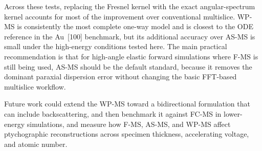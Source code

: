 \documentclass[preprint,12pt,number]{elsarticle}
\begin{document}
Across these tests, replacing the Fresnel kernel with the exact angular-spectrum
kernel accounts for most of the improvement over conventional multislice. WP-MS
is consistently the most complete one-way model and is closest to the ODE
reference in the Au~[100] benchmark, but its additional accuracy over AS-MS is
small under the high-energy conditions tested here. The main practical
recommendation is that for high-angle elastic forward simulations
where F-MS is still being used, AS-MS should be the default standard,
because it removes the dominant paraxial dispersion error without changing the
basic FFT-based multislice workflow. 

Future work could extend the WP-MS toward a bidirectional formulation that can include
backscattering, and then benchmark it against FC-MS in lower-energy simulations, and
measure how F-MS, AS-MS, and WP-MS affect ptychographic reconstructions across
specimen thickness, accelerating voltage, and atomic number.


\end{document}
